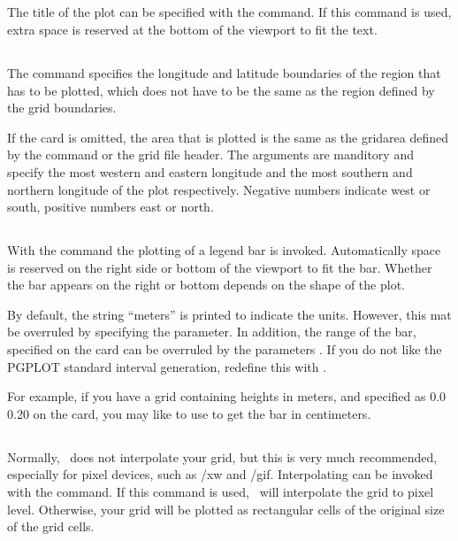 \subsection{}
The title of the plot can be specified with the  command.
If this command is used, extra space is reserved at the bottom of the
viewport to fit the text.

\subsection{}
The  command specifies the longitude and latitude
boundaries of the region that has to be plotted, which does not have to be
the same as the region defined by the grid boundaries.

If the card is omitted, the area that is plotted is the same as the
gridarea defined by the  command or the grid file
header.
The arguments  are manditory and specify the most western and eastern longitude
and the most southern and northern longitude of the plot respectively.
Negative numbers
indicate west or south, positive numbers east or north.

\subsection{}
With the  command the plotting of a legend bar is invoked.
Automatically space is reserved on the right side or bottom of the viewport
to fit the bar. Whether the bar appears on the right or bottom depends on
the shape of the plot.

By default, the string ``meters'' is printed to indicate the units.
However, this mat be overruled by specifying the 
parameter. In addition, the range of the bar, specified on the
 card can be overruled by the parameters
. If you do not like the PGPLOT standard interval
generation, redefine this with .

For example, if you have a grid containing heights in meters, and specified
 as 0.0 0.20 on the  card, you may
like to use  to get the bar in centimeters.

\subsection{}
Normally, \PIM\ does not interpolate your grid, but this is very much
recommended, especially for pixel devices, such as /xw and /gif.
Interpolating can be invoked with the  command.
If this command is used, \PIM\ will interpolate the grid to pixel level.
Otherwise, your grid will be plotted as rectangular cells of the original
size of the grid cells.

